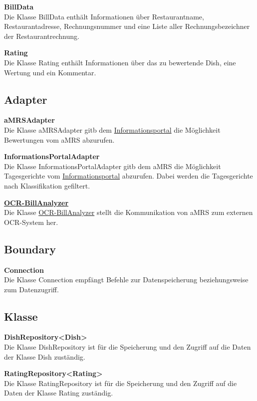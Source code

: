 \noindent \textbf{BillData} \\
Die Klasse BillData enthält Informationen über Restaurantname, Restaurantadresse, Rechnungsnummer und eine Liste aller
Rechnungsbezeichner der Restaurantrechnung.
\newline

\noindent \textbf{Rating} \\
Die Klasse Rating enthält Informationen über das zu bewertende Dish, eine Wertung und ein Kommentar.

\subsection*{Adapter}
\noindent \textbf{aMRSAdapter}\\
Die Klasse aMRSAdapter gitb dem \hyperref[gls:informationsportal]{Informationsportal} die Möglichkeit Bewertungen vom \ac{aMRS} abzurufen.
\newline

\noindent \textbf{InformationsPortalAdapter}\\
Die Klasse InformationsPortalAdapter gitb dem \ac{aMRS} die Möglichkeit Tagesgerichte vom \hyperref[gls:informationsportal]{Informationsportal} abzurufen.
Dabei werden die Tagesgerichte nach Klassifikation gefiltert.
\newline

\noindent \hyperref[gls:ocr-BillAnalyzer]{\textbf{OCR-BillAnalyzer}}\\
Die Klasse \hyperref[gls:ocr-BillAnalyzer]{OCR-BillAnalyzer} stellt die Kommunikation von \ac{aMRS} zum externen OCR-System her.


\subsection*{Boundary}
\noindent \textbf{Connection}\\
Die Klasse Connection empfängt Befehle zur Datenspeicherung beziehungsweise zum Datenzugriff.

\subsection*{Klasse}
\noindent \textbf{DishRepository<Dish>}\\
Die Klasse DishRepository ist für die Speicherung und den Zugriff auf die Daten der Klasse Dish zuständig.
\newline

\noindent \textbf{RatingRepository<Rating>}\\
Die Klasse RatingRepository ist für die Speicherung und den Zugriff auf die Daten der Klasse Rating zuständig.
\newline


